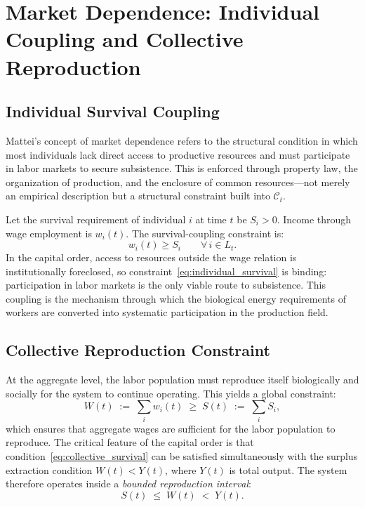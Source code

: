 \documentclass[12pt,a4paper]{article}
\theoremstyle{definition}
\theoremstyle{remark}
\begin{document}
\section{Market Dependence: Individual Coupling and Collective Reproduction}
\label{sec:dependence}

\subsection{Individual Survival Coupling}

Mattei's concept of market dependence refers to the structural condition in which most individuals lack direct access to productive resources and must participate in labor markets to secure subsistence. This is enforced through property law, the organization of production, and the enclosure of common resources---not merely an empirical description but a structural constraint built into $\mathcal{C}_t$.

Let the survival requirement of individual $i$ at time $t$ be $S_i > 0$. Income through wage employment is $w_i(t)$. The survival-coupling constraint is:
\begin{equation}
  \label{eq:individual_survival}
  w_i(t) \geq S_i \qquad \forall\, i \in L_t.
\end{equation}
In the capital order, access to resources outside the wage relation is institutionally foreclosed, so constraint~\eqref{eq:individual_survival} is binding: participation in labor markets is the only viable route to subsistence. This coupling is the mechanism through which the biological energy requirements of workers are converted into systematic participation in the production field.

\subsection{Collective Reproduction Constraint}

At the aggregate level, the labor population must reproduce itself biologically and socially for the system to continue operating. This yields a global constraint:
\begin{equation}
  \label{eq:collective_survival}
  W(t) \;:=\; \sum_i w_i(t) \;\geq\; S(t) \;:=\; \sum_i S_i,
\end{equation}
which ensures that aggregate wages are sufficient for the labor population to reproduce. The critical feature of the capital order is that condition~\eqref{eq:collective_survival} can be satisfied simultaneously with the surplus extraction condition $W(t) < Y(t)$, where $Y(t)$ is total output. The system therefore operates inside a \emph{bounded reproduction interval}:
\begin{equation}
  \label{eq:bounded_interval}
  S(t) \;\leq\; W(t) \;<\; Y(t).
\end{equation}
\end{document}
